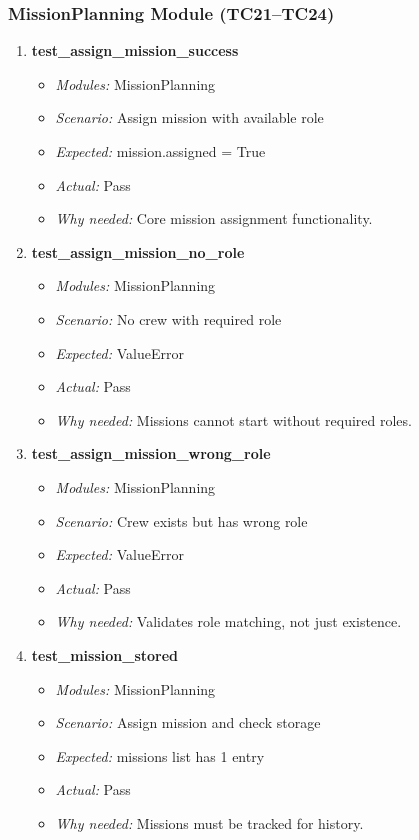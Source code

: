 \documentclass{article}
\begin{document}
\subsubsection*{MissionPlanning Module (TC21--TC24)}
\begin{enumerate}[resume, label=\textbf{TC\arabic*.}]

\item \textbf{test\_assign\_mission\_success}
\begin{itemize}[noitemsep]
  \item \textit{Modules:} MissionPlanning
  \item \textit{Scenario:} Assign mission with available role
  \item \textit{Expected:} mission.assigned = True
  \item \textit{Actual:} Pass
  \item \textit{Why needed:} Core mission assignment functionality.
\end{itemize}

\item \textbf{test\_assign\_mission\_no\_role}
\begin{itemize}[noitemsep]
  \item \textit{Modules:} MissionPlanning
  \item \textit{Scenario:} No crew with required role
  \item \textit{Expected:} ValueError
  \item \textit{Actual:} Pass
  \item \textit{Why needed:} Missions cannot start without required roles.
\end{itemize}

\item \textbf{test\_assign\_mission\_wrong\_role}
\begin{itemize}[noitemsep]
  \item \textit{Modules:} MissionPlanning
  \item \textit{Scenario:} Crew exists but has wrong role
  \item \textit{Expected:} ValueError
  \item \textit{Actual:} Pass
  \item \textit{Why needed:} Validates role matching, not just existence.
\end{itemize}

\item \textbf{test\_mission\_stored}
\begin{itemize}[noitemsep]
  \item \textit{Modules:} MissionPlanning
  \item \textit{Scenario:} Assign mission and check storage
  \item \textit{Expected:} missions list has 1 entry
  \item \textit{Actual:} Pass
  \item \textit{Why needed:} Missions must be tracked for history.
\end{itemize}

\end{enumerate}
\end{document}
